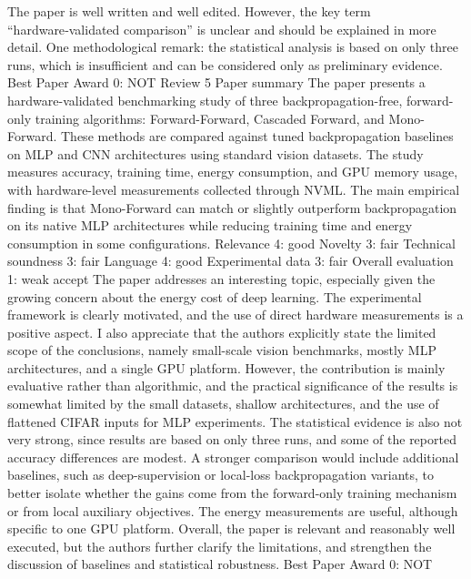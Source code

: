 The paper is well written and well edited.
However, the key term “hardware‑validated comparison” is unclear and should be explained in more detail.
One methodological remark: the statistical analysis is based on only three runs, which is insufficient and can be considered only
as preliminary evidence.
Best Paper Award	
0: NOT
Review 5
Paper summary	The paper presents a hardware-validated benchmarking study of three backpropagation-free, forward-only training algorithms: Forward-Forward, Cascaded Forward, and Mono-Forward. These methods are compared against tuned backpropagation baselines on MLP and CNN architectures using standard vision datasets. The study measures accuracy, training time, energy consumption, and GPU memory usage, with hardware-level measurements collected through NVML. The main empirical finding is that Mono-Forward can match or slightly outperform backpropagation on its native MLP architectures while reducing training time and energy consumption in some configurations.
Relevance	
4: good
Novelty	
3: fair
Technical soundness	
3: fair
Language	
4: good
Experimental data	
3: fair
Overall evaluation	
1: weak accept
The paper addresses an interesting topic, especially given the growing concern about the energy cost of deep learning. The experimental framework is clearly motivated, and the use of direct hardware measurements is a positive aspect. I also appreciate that the authors explicitly state the limited scope of the conclusions, namely small-scale vision benchmarks, mostly MLP architectures, and a single GPU platform. However, the contribution is mainly evaluative rather than algorithmic, and the practical significance of the results is somewhat limited by the small datasets, shallow architectures, and the use of flattened CIFAR inputs for MLP experiments. The statistical evidence is also not very strong, since results are based on only three runs, and some of the reported accuracy differences are modest. A stronger comparison would include additional baselines, such as deep-supervision or local-loss backpropagation variants, to better isolate whether the gains come from the forward-only training mechanism or from local auxiliary objectives. The energy measurements are useful, although specific to one GPU platform. Overall, the paper is relevant and reasonably well executed, but the authors further clarify the limitations, and strengthen the discussion of baselines and statistical robustness.
Best Paper Award	
0: NOT
